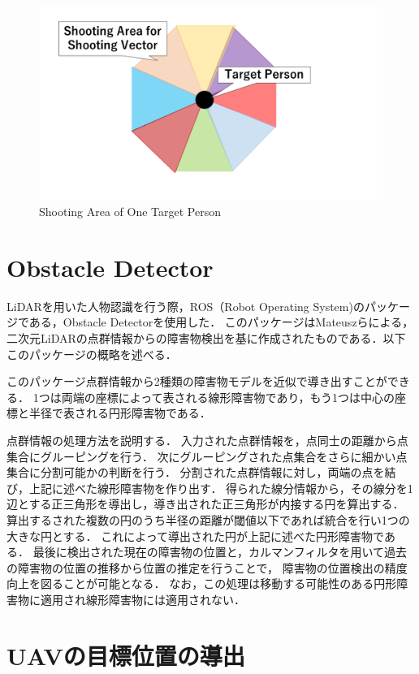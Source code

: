 \documentclass[autodetect-engine,dvipdfmx-if-dvi,ja=standard,a4j,jbase=11pt,magstyle=nomag*]{bxjsreport}
\begin{document}
\begin{figure}[b]
    \centering
    \includegraphics[width=\linewidth, clip]{./figure/chapter2/shooting_area.png}
    \caption{Shooting Area of One Target Person}
    \label{fig:shoot_area}
\end{figure}

\section{Obstacle Detector}
LiDARを用いた人物認識を行う際，ROS（Robot Operating System)のパッケージである，Obstacle Detectorを使用した．
このパッケージはMateuszらによる，二次元LiDARの点群情報からの障害物検出\cite{obstacle_detector_1}を基に作成されたものである．以下このパッケージの概略を述べる．

このパッケージ点群情報から2種類の障害物モデルを近似で導き出すことができる．
1つは両端の座標によって表される線形障害物であり，もう1つは中心の座標と半径で表される円形障害物である．

点群情報の処理方法を説明する．
入力された点群情報を，点同士の距離から点集合にグルーピングを行う．
次にグルーピングされた点集合をさらに細かい点集合に分割可能かの判断を行う．
分割された点群情報に対し，両端の点を結び，上記に述べた線形障害物を作り出す．
得られた線分情報から，その線分を1辺とする正三角形を導出し，導き出された正三角形が内接する円を算出する．
算出するされた複数の円のうち半径の距離が閾値以下であれば統合を行い1つの大きな円とする．
これによって導出された円が上記に述べた円形障害物である．
最後に検出された現在の障害物の位置と，カルマンフィルタを用いて過去の障害物の位置の推移から位置の推定を行うことで，
障害物の位置検出の精度向上を図ることが可能となる．
なお，この処理は移動する可能性のある円形障害物に適用され線形障害物には適用されない．


\section{UAVの目標位置の導出}
\end{document}
